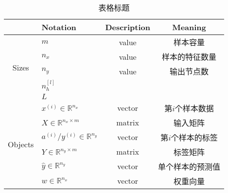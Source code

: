 	\begin{table}[h]
		\centering
		\begin{threeparttable}
		\caption{表格标题}
		\begin{tabular}{clcc}
			\hline
									 & \textbf{Notation}                         & \textbf{Description} & \textbf{Meaning}                                                   \\ \hline
			\multirow{5}{*}{Sizes}   & $m$                                       & value                & 样本容量                                                               \\
									 & $n_x$                                     & value                & 样本的特征数量                                                            \\
									 & $n_y$                                     & value                & 输出节点数                                                              \\
									 & $n_h^{[l]}$                               &                      &                                                                    \\
									 & $L$                                       &                      &                                                                    \\ \hline
			\multirow{7}{*}{Objects} & $x^{(i)} \in \mathbb{R}^{n_x}$            & vector               & 第$i$个样本数据                                                          \\
									 & $X \in {\mathbb{R}^{n_x \times m}}$       & matrix               & 输入矩阵                                                               \\
									 & $a^{(i)} / y^{(i)} \in \mathbb{R}^{n_y}$  & vector               & 第$i$个样本的标签                                                         \\
									 & $Y \in {\mathbb{R}^{n_y \times m}}$       & matrix               & 标签矩阵                                                               \\
									 & $\hat{y} \in \mathbb{R}^{n_y}$            & vector               & 单个样本的预测值                                                           \\
									 & $w \in \mathbb{R}^{n_x}$                  & vector               & 权重向量                                                               \\

\end{tabular}
\end{threeparttable}
\end{table}
